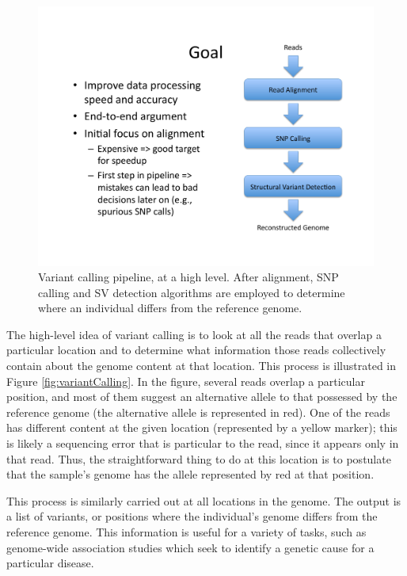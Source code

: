 \documentclass[twocolumn,10pt]{article}
\begin{document}
\begin{figure}[!t]
\centering
\includegraphics[scale=0.6]{pipeline.pdf}
\caption{Variant calling pipeline, at a high level.  After alignment, SNP calling and SV detection algorithms are employed to determine where an individual differs from the reference genome.}
\label{fig:pipeline}
\end{figure}

The high-level idea of variant calling is to look at all the reads that overlap a particular location and to determine what information those reads collectively contain about the genome content at that location.  This process is illustrated in Figure \ref{fig:variantCalling}.  In the figure, several reads overlap a particular position, and most of them suggest an alternative allele to that possessed by the reference genome (the alternative allele is represented in red).  One of the reads has different content at the given location (represented by a yellow marker); this is likely a sequencing error that is particular to the read, since it appears only in that read.  Thus, the straightforward thing to do at this location is to postulate that the sample's genome has the allele represented by red at that position.

This process is similarly carried out at all locations in the genome.  The output is a list of variants, or positions where the individual's genome differs from the reference genome.  This information is useful for a variety of tasks, such as genome-wide association studies which seek to identify a genetic cause for a particular disease.  
\end{document}
